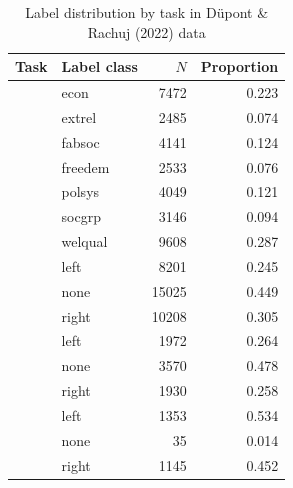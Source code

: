 \begin{table}[!t]

\caption{\label{tab:label_distribution_dupont_and_rachuj_2022}Label distribution by task in Düpont \& Rachuj (2022) data}
\centering
\fontsize{10}{12}\selectfont
\begin{tabular}[t]{>{\raggedright\arraybackslash}L{2.2in}lrr}
\toprule
\headrow Task & Label class & $N$ & Proportion\\
\midrule
 & econ & 7472 & 0.223\\

 & extrel & 2485 & 0.074\\

 & fabsoc & 4141 & 0.124\\

 & freedem & 2533 & 0.076\\

 & polsys & 4049 & 0.121\\

 & socgrp & 3146 & 0.094\\

 & welqual & 9608 & 0.287\\
 & left & 8201 & 0.245\\

 & none & 15025 & 0.449\\

 & right & 10208 & 0.305\\
 & left & 1972 & 0.264\\

 & none & 3570 & 0.478\\

 & right & 1930 & 0.258\\
 & left & 1353 & 0.534\\

 & none & 35 & 0.014\\

 & right & 1145 & 0.452\\
\bottomrule
\end{tabular}
\end{table}
